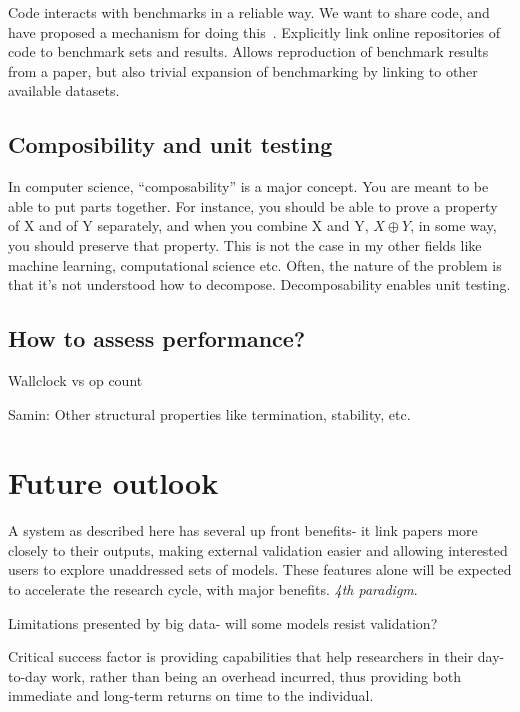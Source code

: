 \documentclass[conference]{IEEEtran}
\begin{document}


Code interacts with benchmarks in a reliable way. We want to share
code, and have proposed a mechanism for doing this~\cite{crick-et-al_wssspe2}.
Explicitly link online repositories of code to benchmark sets and
results. Allows reproduction of benchmark results from a paper, 
but also trivial expansion of benchmarking by linking to other 
available datasets.

\subsection{Composibility and unit testing}
In computer science, ``composability'' is a major concept. You are
meant to be able to put parts together. For instance, you should be
able to prove a property of X and of Y separately, and when you
combine X and Y, $X \oplus Y$, in some way, you should preserve that
property.  This is not the case in my other fields like machine
learning, computational science etc. Often, the nature of the problem
is that it's not understood how to decompose. Decomposability 
enables unit testing. 



\subsection{How to assess performance?}

Wallclock vs op count

Samin: Other structural properties like termination, stability, etc. 

\section{Future outlook}

A system as described here has several up front benefits- it link papers 
more closely to their outputs, making external validation easier and 
allowing interested users to explore unaddressed sets of models. These 
features alone will be expected to accelerate the research cycle, with
major benefits. \emph{4th paradigm}.

Limitations presented by big data- will some models resist validation?

Critical success factor is providing capabilities that help researchers 
in their day-to-day work, rather than being an overhead incurred, thus 
providing both immediate and long-term returns on time to the individual.





\end{document}

